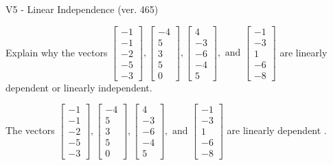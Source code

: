 \begin{exercise}
  \begin{exerciseTitle}V5 - Linear Independence (ver. 465)\end{exerciseTitle}
  \begin{exerciseStatement}
    Explain why the vectors \(\left[\begin{array}{r}
-1 \\
-1 \\
-2 \\
-5 \\
-3
\end{array}\right] , \left[\begin{array}{r}
-4 \\
5 \\
3 \\
5 \\
0
\end{array}\right] , \left[\begin{array}{r}
4 \\
-3 \\
-6 \\
-4 \\
5
\end{array}\right] , \text{ and } \left[\begin{array}{r}
-1 \\
-3 \\
1 \\
-6 \\
-8
\end{array}\right]\) are linearly dependent or linearly independent.	


  \end{exerciseStatement}
  \begin{exerciseAnswer}
   The vectors \(\left[\begin{array}{r}
-1 \\
-1 \\
-2 \\
-5 \\
-3
\end{array}\right] , \left[\begin{array}{r}
-4 \\
5 \\
3 \\
5 \\
0
\end{array}\right] , \left[\begin{array}{r}
4 \\
-3 \\
-6 \\
-4 \\
5
\end{array}\right] , \text{ and } \left[\begin{array}{r}
-1 \\
-3 \\
1 \\
-6 \\
-8
\end{array}\right]\) are 
  	 linearly dependent  .
  


  \end{exerciseAnswer}
\end{exercise}